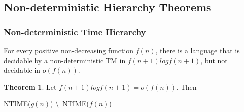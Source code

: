 \documentclass{article}
\theoremstyle{definition}
\newtheorem{theorem}{Theorem}[section]
\begin{document}
\subsection{Non-deterministic Hierarchy Theorems}
\subsubsection{Non-deterministic Time Hierarchy}
For every positive non-decreasing function $f(n)$, there is a language that is decidable by a non-deterministic TM in $f(n+1)logf(n+1)$, but not decidable in $o(f(n))$.
\begin{theorem}
Let $f(n+1)logf(n+1) = o(f(n))$. Then
\begin{center}
\textsc{NTIME}($g(n)$) \textbackslash\ \textsc{NTIME}($f(n)$) \neq {}
\end{center}
\end{theorem}
\end{document}
